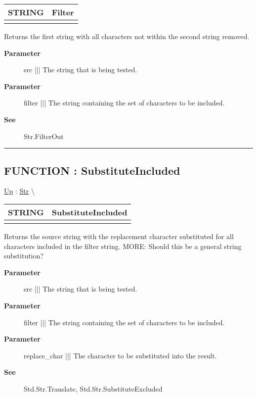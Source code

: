 {\renewcommand{\arraystretch}{1.5}
\begin{tabularx}{\textwidth}{|>{\raggedright\arraybackslash}l|X|}
\hline
\hspace{0pt}STRING & Filter \\
\hline
\multicolumn{2}{|>{\raggedright\arraybackslash}X|}{\hspace{0pt}(STRING src, STRING filter)} \\
\hline
\end{tabularx}
}

\par
Returns the first string with all characters not within the second string removed.

\par
\begin{description}
\item [\textbf{Parameter}] src ||| The string that is being tested.
\item [\textbf{Parameter}] filter ||| The string containing the set of characters to be included.
\item [\textbf{See}] Str.FilterOut
\end{description}

\rule{\linewidth}{0.5pt}
\subsection*{FUNCTION : SubstituteIncluded}
\hypertarget{ecldoc:str.substituteincluded}{}
\hyperlink{ecldoc:Str}{Up} :
\hspace{0pt} \hyperlink{ecldoc:Str}{Str} \textbackslash 

{\renewcommand{\arraystretch}{1.5}
\begin{tabularx}{\textwidth}{|>{\raggedright\arraybackslash}l|X|}
\hline
\hspace{0pt}STRING & SubstituteIncluded \\
\hline
\multicolumn{2}{|>{\raggedright\arraybackslash}X|}{\hspace{0pt}(STRING src, STRING filter, STRING1 replace\_char)} \\
\hline
\end{tabularx}
}

\par
Returns the source string with the replacement character substituted for all characters included in the filter string. MORE: Should this be a general string substitution?

\par
\begin{description}
\item [\textbf{Parameter}] src ||| The string that is being tested.
\item [\textbf{Parameter}] filter ||| The string containing the set of characters to be included.
\item [\textbf{Parameter}] replace\_char ||| The character to be substituted into the result.
\item [\textbf{See}] Std.Str.Translate, Std.Str.SubstituteExcluded
\end{description}

